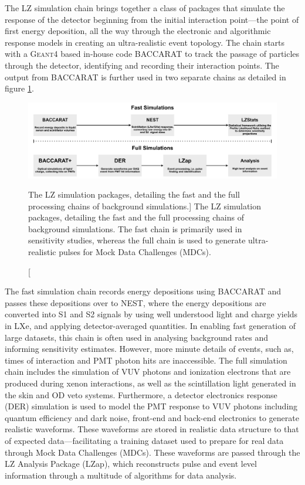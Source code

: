 The LZ simulation chain brings together a class of packages that simulate the response of the detector beginning from the initial interaction point---the point of first energy deposition, all the way through the electronic and algorithmic response models in creating an ultra-realistic event topology. The chain starts with a \textsc{Geant4} based in-house code \textsc{BACCARAT} to track the passage of particles through the detector, identifying and recording their interaction points. The output from \textsc{BACCARAT} is further used in two separate chains as detailed in figure \ref{fig:lz_simulation_chains}. 

%
\begin{figure}[b]
    \centering
    \hspace*{-0.2cm}
    \includegraphics[scale=0.7]{Chapter_5/Figures/LZ_simulations_chains.png}
    \caption
    [The LZ simulation packages, detailing the fast and the full processing chains of background simulations.]
    {The LZ simulation packages, detailing the fast and the full processing chains of background simulations. The fast chain is primarily used in sensitivity studies, whereas the full chain is used to generate ultra-realistic pulses for Mock Data Challenges (MDCs).}
    \label{fig:lz_simulation_chains}
\end{figure}
%

The fast simulation chain records energy depositions using \textsc{BACCARAT} and passes these depositions over to \textsc{NEST}, where the energy depositions are converted into S1 and S2 signals by using well understood light and charge yields in LXe, and applying detector-averaged quantities. In enabling fast generation of large datasets, this chain is often used in analysing background rates and informing sensitivity estimates. However, more minute details of events, such as, times of interaction and PMT photon hits are inaccessible. The full simulation chain includes the simulation of VUV photons and ionization electrons that are produced during xenon interactions, as well as the scintillation light generated in the skin and OD veto systems. Furthermore, a detector electronics response (DER) simulation is used to model the PMT response to VUV photons including quantum efficiency and dark noise, front-end and back-end electronics to generate realistic waveforms. These waveforms are stored in realistic data structure to that of expected data---facilitating a training dataset used to prepare for real data through Mock Data Challenges (MDCs). These waveforms are passed through the LZ Analysis Package (LZap), which reconstructs pulse and event level information through a multitude of algorithms for data analysis.

